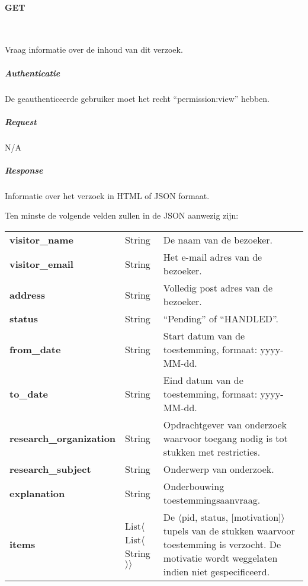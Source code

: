 \documentclass[a4paper,titlepage]{report}
\makeatletter
\def\namedlabel#1#2{
  \label{#1}
  \begingroup
   \def\@currentlabel{#2}%
   \label{#1:name}\endgroup
}
\makeatother
\begin{document}
        \paragraph{GET}\hfill\\
          \namedlabel{api:permission:get}{GET /permission/[id]}
          Vraag informatie over de inhoud van dit verzoek.

          \subparagraph{Authenticatie}
            De geauthenticeerde gebruiker moet het recht ``permission:view''
            hebben.

          \subparagraph{Request} N/A

          \subparagraph{Response}
            Informatie over het verzoek in HTML of JSON formaat.

            Ten minste de volgende velden zullen in de JSON aanwezig zijn:\\

            \begin{tabular}{ l l p{8cm} }
              \textbf{visitor\_name} & String & De naam van de bezoeker. \\
              \textbf{visitor\_email} & String & Het e-mail adres van de
              bezoeker. \\
              \textbf{address} & String & Volledig post adres van de bezoeker.
              \\
              \textbf{status} & String & ``Pending'' of ``HANDLED''. \\
              \textbf{from\_date} & String & Start datum van de toestemming,
              formaat: yyyy-MM-dd. \\
              \textbf{to\_date} & String & Eind datum van de toestemming,
              formaat: yyyy-MM-dd. \\
              \textbf{research\_organization} & String & Opdrachtgever van
              onderzoek waarvoor toegang nodig is tot stukken met restricties.
              \\
              \textbf{research\_subject} & String & Onderwerp van onderzoek. \\
              \textbf{explanation} & String & Onderbouwing toestemmingsaanvraag.
              \\
              \textbf{items} & List$\langle$List$\langle$String$\rangle\rangle$
              & De $\langle$pid, status, [motivation]$\rangle$ tupels van de stukken waarvoor
              toestemming is verzocht. De motivatie wordt weggelaten indien niet
              gespecificeerd.\\

            \end{tabular}
\end{document}
